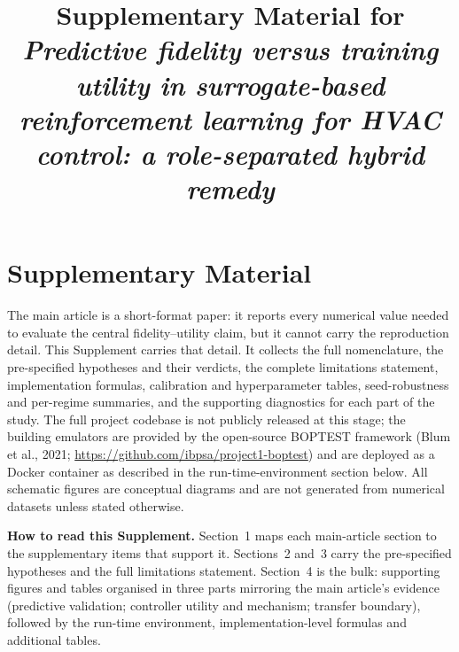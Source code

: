 \documentclass[11pt,a4paper]{article}
\title{Supplementary Material for\\[2pt]
\emph{Predictive fidelity versus training utility in surrogate-based reinforcement
learning for HVAC control: a role-separated hybrid remedy}}
\author{}
\date{}
\begin{document}
\maketitle
\section*{Supplementary Material}
The main article is a short-format paper: it reports every numerical value needed to evaluate the central fidelity--utility claim, but it cannot carry the reproduction detail. This Supplement carries that detail. It collects the full nomenclature, the pre-specified hypotheses and their verdicts, the complete limitations statement, implementation formulas, calibration and hyperparameter tables, seed-robustness and per-regime summaries, and the supporting diagnostics for each part of the study. The full project codebase is not publicly released at this stage; the building emulators are provided by the open-source BOPTEST framework (Blum et al., 2021; \url{https://github.com/ibpsa/project1-boptest}) and are deployed as a Docker container as described in the run-time-environment section below. All schematic figures are conceptual diagrams and are not generated from numerical datasets unless stated otherwise.\par
\medskip\noindent\textbf{How to read this Supplement.} Section~1 maps each main-article section to the supplementary items that support it. Sections~2 and~3 carry the pre-specified hypotheses and the full limitations statement. Section~4 is the bulk: supporting figures and tables organised in three parts mirroring the main article's evidence (predictive validation; controller utility and mechanism; transfer boundary), followed by the run-time environment, implementation-level formulas and additional tables.\par
\medskip\noindent{}\par\medskip
\end{document}
